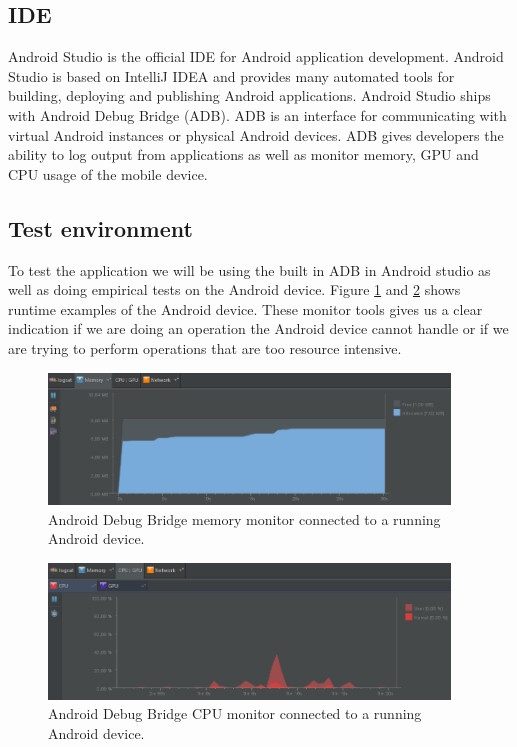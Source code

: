\subsection{IDE}
Android Studio \cite{androidIDE} is the official IDE for Android application development. Android Studio is based on IntelliJ IDEA \cite{intelliJIDEA} and provides many automated tools for building, deploying and publishing Android applications. Android Studio ships with Android Debug Bridge (ADB). ADB is an interface for communicating with virtual Android instances or physical Android devices. ADB gives developers the ability to log output from applications as well as monitor memory, GPU and CPU usage of the mobile device.

\subsection{Test environment}
To test the application we will be using the built in ADB in Android studio as well as doing empirical tests on the Android device. Figure \ref{fig:ADBMemory} and \ref{fig:ADBCPU} shows runtime examples of the Android device. These monitor tools gives us a clear indication if we are doing an operation the Android device cannot handle or if we are trying to perform operations that are too resource intensive.

\begin{figure}[h!]
  \caption{Android Debug Bridge memory monitor connected to a running Android device.}
  \label{fig:ADBMemory}
  \centering
    \includegraphics[width=0.95\textwidth]{images/ADBMemory.png}
\end{figure}

\begin{figure}[h!]
  \caption{Android Debug Bridge CPU monitor connected to a running Android device.}
  \label{fig:ADBCPU}
  \centering
    \includegraphics[width=0.95\textwidth]{images/ADBCPU.png}
\end{figure}

